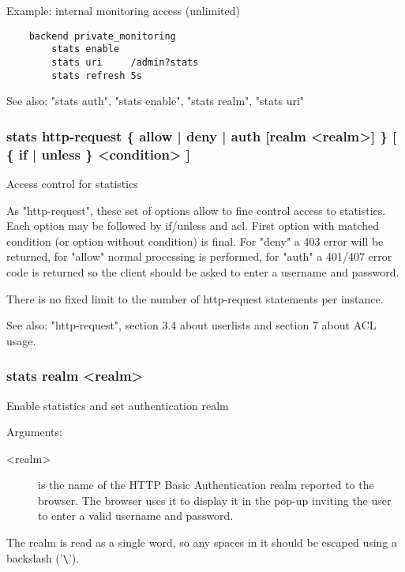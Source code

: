    Example: internal monitoring access (unlimited)
   \begin{verbatim}
    backend private_monitoring
        stats enable
        stats uri     /admin?stats
        stats refresh 5s
   \end{verbatim}

  See also: "stats auth", "stats enable", "stats realm", "stats uri"

\subsubsection[stats http-request]{stats http-request \{ allow | deny | auth [realm <realm>] \} [ \{ if | unless \} <condition> ]}


  Access control for statistics


  As "http-request", these set of options allow to fine control access to
  statistics. Each option may be followed by if/unless and acl.
  First option with matched condition (or option without condition) is final.
  For "deny" a 403 error will be returned, for "allow" normal processing is
  performed, for "auth" a 401/407 error code is returned so the client
  should be asked to enter a username and password.

  There is no fixed limit to the number of http-request statements per
  instance.

  See also: "http-request", section 3.4 about userlists and section 7
             about ACL usage.

\subsubsection[stats realm]{stats realm <realm>}

  Enable statistics and set authentication realm


  Arguments:
  \begin{description}
  \item[<realm>] is the name of the HTTP Basic Authentication realm reported to
              the browser. The browser uses it to display it in the pop-up
              inviting the user to enter a valid username and password.
  \end{description}

  The realm is read as a single word, so any spaces in it should be escaped
  using a backslash ('\verb|\|').


